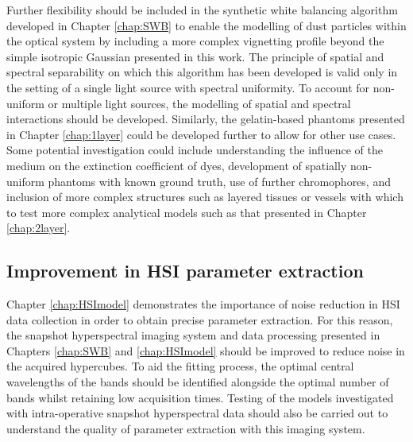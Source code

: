 Further flexibility should be included in the synthetic white balancing algorithm developed in Chapter \ref{chap:SWB} to enable the modelling of dust particles within the optical system by including a more complex vignetting profile beyond the simple isotropic Gaussian presented in this work. The principle of spatial and spectral separability on which this algorithm has been developed is valid only in the setting of a single light source with spectral uniformity. To account for non-uniform or multiple light sources, the modelling of spatial and spectral interactions should be developed. Similarly, the gelatin-based phantoms presented in Chapter \ref{chap:1layer} could be developed further to allow for other use cases. Some potential investigation could include understanding the influence of the medium on the extinction coefficient of dyes, development of spatially non-uniform phantoms with known ground truth, use of further chromophores, and inclusion of more complex structures such as layered tissues or vessels with which to test more complex analytical models such as that presented in Chapter \ref{chap:2layer}. 

\subsection{Improvement in HSI parameter extraction}
Chapter \ref{chap:HSImodel} demonstrates the importance of noise reduction in HSI data collection in order to obtain precise parameter extraction. For this reason, the snapshot hyperspectral imaging system and data processing presented in Chapters \ref{chap:SWB} and \ref{chap:HSImodel} should be improved to reduce noise in the acquired hypercubes. To aid the fitting process, the optimal central wavelengths of the bands should be identified alongside the optimal number of bands whilst retaining low acquisition times. Testing of the models investigated with intra-operative snapshot hyperspectral data should also be carried out to understand the quality of parameter extraction with this imaging system. 


